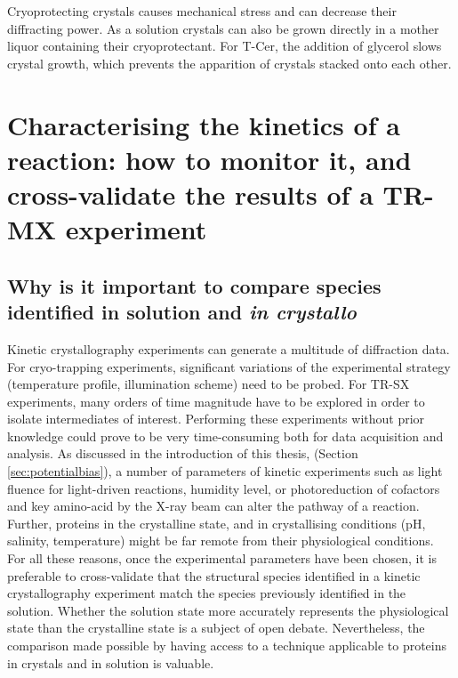 Cryoprotecting crystals causes mechanical stress and can decrease their diffracting power. As a solution crystals can also be grown directly in a mother liquor containing their cryoprotectant. For T-Cer, the addition of glycerol slows crystal growth, which prevents the apparition of crystals stacked onto each other. 

\section{Characterising the kinetics of a reaction: how to monitor it, and cross-validate the results of a TR-MX experiment} 
\subsection{Why is it important to compare species identified in solution and \textit{in crystallo}}\label{sec:icOS_interest}
Kinetic crystallography experiments can generate a multitude of diffraction data. For cryo-trapping experiments, significant variations of the experimental strategy (temperature profile, illumination scheme) need to be probed. For TR-SX experiments, many orders of time magnitude have to be explored in order to isolate intermediates of interest. Performing these experiments without prior knowledge could prove to be very time-consuming both for data acquisition and analysis. As discussed in the introduction of this thesis, (Section \ref{sec:potentialbias}), a number of parameters of kinetic experiments such as light fluence for light-driven reactions, humidity level, or photoreduction of cofactors and key amino-acid by the X-ray beam can alter the pathway of a reaction. Further, proteins in the crystalline state, and in crystallising conditions (pH, salinity, temperature) might be far remote from their physiological conditions. For all these reasons, once the experimental parameters have been chosen, it is preferable to cross-validate that the structural species identified in a kinetic crystallography experiment match the species previously identified in the solution. Whether the solution state more accurately represents the physiological state than the crystalline state is a subject of open debate. Nevertheless, the comparison made possible by having access to a technique applicable to proteins in crystals and in solution is valuable. 
